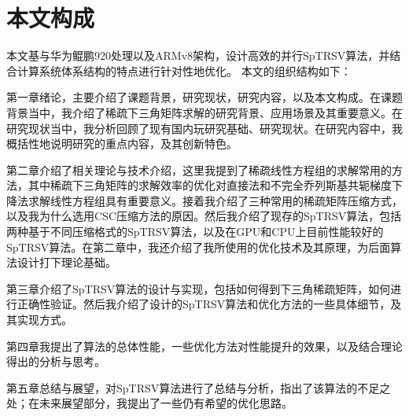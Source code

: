 \section{本文构成}

本文基与华为鲲鹏920处理以及ARMv8架构，设计高效的并行SpTRSV算法，并结合计算系统体系结构的特点进行针对性地优化。
本文的组织结构如下：

第一章绪论，主要介绍了课题背景，研究现状，研究内容，以及本文构成。在课题背景当中，我介绍了稀疏下三角矩阵求解的研究背景、应用场景及其重要意义。在研究现状当中，我分析回顾了现有国内玩研究基础、研究现状。在研究内容中，我概括性地说明研究的重点内容，及其创新特色。

第二章介绍了相关理论与技术介绍，这里我提到了稀疏线性方程组的求解常用的方法，其中稀疏下三角矩阵的求解效率的优化对直接法和不完全乔列斯基共轭梯度下降法求解线性方程组具有重要意义。接着我介绍了三种常用的稀疏矩阵压缩方式，以及我为什么选用CSC压缩方法的原因。然后我介绍了现存的SpTRSV算法，包括两种基于不同压缩格式的SpTRSV算法，以及在GPU和CPU上目前性能较好的SpTRSV算法。在第二章中，我还介绍了我所使用的优化技术及其原理，为后面算法设计打下理论基础。

第三章介绍了SpTRSV算法的设计与实现，包括如何得到下三角稀疏矩阵，如何进行正确性验证。然后我介绍了设计的SpTRSV算法和优化方法的一些具体细节，及其实现方式。

第四章我提出了算法的总体性能，一些优化方法对性能提升的效果，以及结合理论得出的分析与思考。

第五章总结与展望，对SpTRSV算法进行了总结与分析，指出了该算法的不足之处；在未来展望部分，我提出了一些仍有希望的优化思路。

\endinput
